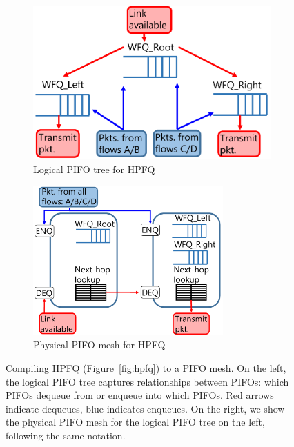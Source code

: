 \begin{figure}[!t]
  \begin{subfigure}[b]{0.5\textwidth}
  \begin{center}
  \includegraphics[width=\textwidth]{pifo_hpfq_logical.pdf}
  \caption{Logical PIFO tree for HPFQ}
  \label{fig:hpfq_path}
  \end{center}
  \end{subfigure}
  \begin{subfigure}[b]{0.5\textwidth}
  \begin{center}
  \includegraphics[width=0.8\textwidth]{pifo_hpfq_physical.pdf}
  \caption{Physical PIFO mesh for HPFQ}
  \label{fig:hpfq_mesh}
  \end{center}
  \end{subfigure}
  \caption{Compiling HPFQ (Figure~\ref{fig:hpfq}) to a PIFO mesh. On the left,
  the logical PIFO tree captures relationships between PIFOs: which PIFOs dequeue from
  or enqueue into which PIFOs. Red arrows indicate dequeues, blue indicates
  enqueues.  On the right, we show the physical PIFO mesh for the logical PIFO
  tree on the left, following the same notation.}
  \label{fig:hpfq_compiling}
\end{figure}

